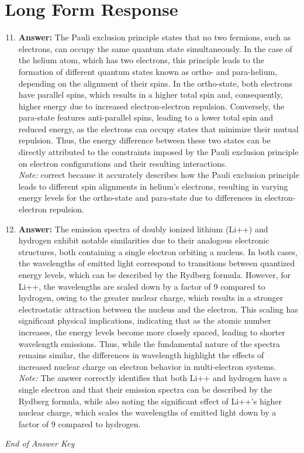 \documentclass[12pt]{article}
\begin{document}
\section*{Long Form Response}
\begin{enumerate}[label=\arabic*.]
\setcounter{enumi}{10}
\item \textbf{Answer:} The Pauli exclusion principle states that no two fermions, such as electrons, can occupy the same quantum state simultaneously. In the case of the helium atom, which has two electrons, this principle leads to the formation of different quantum states known as ortho- and para-helium, depending on the alignment of their spins. In the ortho-state, both electrons have parallel spins, which results in a higher total spin and, consequently, higher energy due to increased electron-electron repulsion. Conversely, the para-state features anti-parallel spins, leading to a lower total spin and reduced energy, as the electrons can occupy states that minimize their mutual repulsion. Thus, the energy difference between these two states can be directly attributed to the constraints imposed by the Pauli exclusion principle on electron configurations and their resulting interactions.
\\ \textit{Note:} correct because it accurately describes how the Pauli exclusion principle leads to different spin alignments in helium's electrons, resulting in varying energy levels for the ortho-state and para-state due to differences in electron-electron repulsion.
\item \textbf{Answer:} The emission spectra of doubly ionized lithium (Li++) and hydrogen exhibit notable similarities due to their analogous electronic structures, both containing a single electron orbiting a nucleus. In both cases, the wavelengths of emitted light correspond to transitions between quantized energy levels, which can be described by the Rydberg formula. However, for Li++, the wavelengths are scaled down by a factor of 9 compared to hydrogen, owing to the greater nuclear charge, which results in a stronger electrostatic attraction between the nucleus and the electron. This scaling has significant physical implications, indicating that as the atomic number increases, the energy levels become more closely spaced, leading to shorter wavelength emissions. Thus, while the fundamental nature of the spectra remains similar, the differences in wavelength highlight the effects of increased nuclear charge on electron behavior in multi-electron systems.
\\ \textit{Note:} The answer correctly identifies that both Li++ and hydrogen have a single electron and that their emission spectra can be described by the Rydberg formula, while also noting the significant effect of Li++'s higher nuclear charge, which scales the wavelengths of emitted light down by a factor of 9 compared to hydrogen.
\end{enumerate}

\vfill
\noindent\textit{End of Answer Key}
\end{document}
